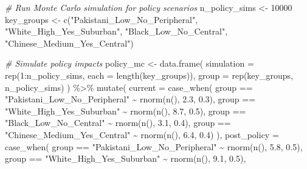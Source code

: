 \documentclass[
]{article}
\newenvironment{Shaded}{\begin{snugshade}}{\end{snugshade}}
\newcommand{\AttributeTok}[1]{\textcolor[rgb]{0.77,0.63,0.00}{#1}}
\newcommand{\CommentTok}[1]{\textcolor[rgb]{0.56,0.35,0.01}{\textit{#1}}}
\newcommand{\DecValTok}[1]{\textcolor[rgb]{0.00,0.00,0.81}{#1}}
\newcommand{\FloatTok}[1]{\textcolor[rgb]{0.00,0.00,0.81}{#1}}
\newcommand{\FunctionTok}[1]{\textcolor[rgb]{0.00,0.00,0.00}{#1}}
\newcommand{\NormalTok}[1]{#1}
\newcommand{\OtherTok}[1]{\textcolor[rgb]{0.56,0.35,0.01}{#1}}
\newcommand{\SpecialCharTok}[1]{\textcolor[rgb]{0.00,0.00,0.00}{#1}}
\newcommand{\StringTok}[1]{\textcolor[rgb]{0.31,0.60,0.02}{#1}}
\begin{document}
\begin{Shaded}
\begin{Highlighting}[]
\CommentTok{\# Run Monte Carlo simulation for policy scenarios}
\NormalTok{n\_policy\_sims }\OtherTok{\textless{}{-}} \DecValTok{10000}
\NormalTok{key\_groups }\OtherTok{\textless{}{-}} \FunctionTok{c}\NormalTok{(}\StringTok{"Pakistani\_Low\_No\_Peripheral"}\NormalTok{, }
                \StringTok{"White\_High\_Yes\_Suburban"}\NormalTok{,}
                \StringTok{"Black\_Low\_No\_Central"}\NormalTok{,}
                \StringTok{"Chinese\_Medium\_Yes\_Central"}\NormalTok{)}

\CommentTok{\# Simulate policy impacts}
\NormalTok{policy\_mc }\OtherTok{\textless{}{-}} \FunctionTok{data.frame}\NormalTok{(}
  \AttributeTok{simulation =} \FunctionTok{rep}\NormalTok{(}\DecValTok{1}\SpecialCharTok{:}\NormalTok{n\_policy\_sims, }\AttributeTok{each =} \FunctionTok{length}\NormalTok{(key\_groups)),}
  \AttributeTok{group =} \FunctionTok{rep}\NormalTok{(key\_groups, n\_policy\_sims)}
\NormalTok{) }\SpecialCharTok{\%\textgreater{}\%}
  \FunctionTok{mutate}\NormalTok{(}
    \AttributeTok{current =} \FunctionTok{case\_when}\NormalTok{(}
\NormalTok{      group }\SpecialCharTok{==} \StringTok{"Pakistani\_Low\_No\_Peripheral"} \SpecialCharTok{\textasciitilde{}} \FunctionTok{rnorm}\NormalTok{(}\FunctionTok{n}\NormalTok{(), }\FloatTok{2.3}\NormalTok{, }\FloatTok{0.3}\NormalTok{),}
\NormalTok{      group }\SpecialCharTok{==} \StringTok{"White\_High\_Yes\_Suburban"} \SpecialCharTok{\textasciitilde{}} \FunctionTok{rnorm}\NormalTok{(}\FunctionTok{n}\NormalTok{(), }\FloatTok{8.7}\NormalTok{, }\FloatTok{0.5}\NormalTok{),}
\NormalTok{      group }\SpecialCharTok{==} \StringTok{"Black\_Low\_No\_Central"} \SpecialCharTok{\textasciitilde{}} \FunctionTok{rnorm}\NormalTok{(}\FunctionTok{n}\NormalTok{(), }\FloatTok{3.1}\NormalTok{, }\FloatTok{0.4}\NormalTok{),}
\NormalTok{      group }\SpecialCharTok{==} \StringTok{"Chinese\_Medium\_Yes\_Central"} \SpecialCharTok{\textasciitilde{}} \FunctionTok{rnorm}\NormalTok{(}\FunctionTok{n}\NormalTok{(), }\FloatTok{6.4}\NormalTok{, }\FloatTok{0.4}\NormalTok{)}
\NormalTok{    ),}
    \AttributeTok{post\_policy =} \FunctionTok{case\_when}\NormalTok{(}
\NormalTok{      group }\SpecialCharTok{==} \StringTok{"Pakistani\_Low\_No\_Peripheral"} \SpecialCharTok{\textasciitilde{}} \FunctionTok{rnorm}\NormalTok{(}\FunctionTok{n}\NormalTok{(), }\FloatTok{5.8}\NormalTok{, }\FloatTok{0.5}\NormalTok{),}
\NormalTok{      group }\SpecialCharTok{==} \StringTok{"White\_High\_Yes\_Suburban"} \SpecialCharTok{\textasciitilde{}} \FunctionTok{rnorm}\NormalTok{(}\FunctionTok{n}\NormalTok{(), }\FloatTok{9.1}\NormalTok{, }\FloatTok{0.5}\NormalTok{),}

\end{Highlighting}
\end{Shaded}
\end{document}

